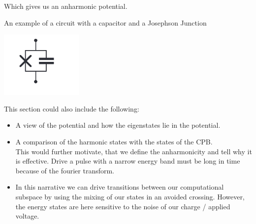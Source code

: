 Which gives us an anharmonic potential.

\begin{marginfigure}
    \caption{An example of a circuit with a capacitor and a Josephson Junction}
    \includegraphics[width = \textwidth]{tex/fig_for_text/CooperPairIsland.png}
    \label{fig:cooper_pair_island}
\end{marginfigure}
\vspace{1 cm}
This section could also include the following:
\begin{itemize}
    \item A view of the potential and how the eigenstates lie in the potential.
    \item A comparison of the harmonic states with the states of the CPB. \\
    This would further motivate, that we define the anharmonicity and tell why it is effective. Drive a pulse with a narrow energy band must be long in time because of the fourier transform. \\
    \item In this narrative we can drive transitions between our computational subspace by using the mixing of our states in an avoided crossing. However, the energy states are here sensitive to the noise of our charge / applied voltage. 
\end{itemize}

